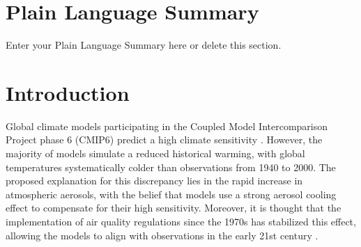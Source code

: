 \documentclass[draft]{agujournal2019}
\begin{document}
\section*{Plain Language Summary}
Enter your Plain Language Summary here or delete this section.


%
%

%


%
%
%
%


\section{Introduction}
      Global climate models participating in the Coupled Model Intercomparison Project phase 6 (CMIP6) predict a high climate sensitivity \cite{Flynn_2020}. However, the majority of models simulate a reduced historical warming, with global temperatures systematically colder than observations from 1940 to 2000. The proposed explanation for this discrepancy lies in the rapid increase in atmospheric aerosols, with the belief that models use a strong aerosol cooling effect to compensate for their high sensitivity. Moreover, it is thought that the implementation of air quality regulations since the 1970s has stabilized this effect, allowing the models to align with observations in the early 21st century \cite{Flynn_2020}. 
\end{document}
